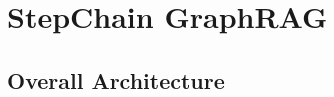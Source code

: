 \documentclass[runningheads]{llncs}
\begin{document}
\section{StepChain GraphRAG}

\subsection{Overall Architecture}


\end{document}
